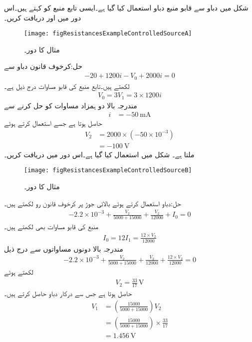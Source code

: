 شکل  میں دباو سے قابو منبع دباو استعمال کیا گیا ہے۔ایسی تابع منبع کو  کہتے ہیں۔اس دور میں   اور  دریافت کریں۔
\begin{figure}
\centering
\texttt{[image: figResistancesExampleControlledSourceA]}
\caption{مثال  کا دور۔}
\label{شکل_مزاحمتی_مثال_تابع_منبع_الف}
\end{figure}

حل:کرخوف قانون دباو سے
\begin{align*}
-20+1200 i-V_0+2000 i=0
\end{align*}
لکھتے ہیں۔تابع منبع کی قابو مساوات درج ذیل ہے۔
\begin{align*}
V_0=3V_1 = 3\times 1200 i
\end{align*}
مندرجہ بالا دو ہمزاد مساوات کو حل کرنے سے
\begin{align*}
i&=\SI{-50}{\milli\ampere}
\end{align*}
حاصل ہوتا ہے جسے استعمال کرتے ہوئے
\begin{align*}
V_2&=2000 \times (-50\times 10^{-3})\\
&=\SI{-100}{\volt}
\end{align*}
ملتا ہے۔
شکل  میں  استعمال کیا گیا ہے۔اس دور میں  دریافت کریں۔
\begin{figure}
\centering
\texttt{[image: figResistancesExampleControlledSourceB]}
\caption{مثال  کا دور۔}
\label{شکل_مزاحمتی_مثال_تابع_منبع_ب}
\end{figure}

حل:دباو  استعمال کرتے ہوئے بالائی جوڑ پر کرخوف قانون رو لکھتے ہیں۔
\begin{align*}
-2.2\times 10^{-3}+\frac{V_2}{5000+15000}+\frac{V_2}{12000}+I_0=0
\end{align*}
منبع کی قابو مساوات بھی لکھتے ہیں۔
\begin{align*}
I_0=12 I_1 = \frac{12 \times V_2}{12000} 
\end{align*}
مندرجہ بالا دونوں مساواتوں سے درج ذیل
\begin{align*}
-2.2\times 10^{-3}+\frac{V_2}{5000+15000}+\frac{V_2}{12000}+ \frac{12 \times V_2}{12000} =0
\end{align*}
لکھتے ہوئے
\begin{align*}
V_2=\frac{33}{17} \, \si{\volt}
\end{align*}
حاصل ہوتا ہے جس سے درکار دباو حاصل کرتے ہیں۔
\begin{align*}
V_1&=\left(\frac{15000}{5000+15000} \right) V_2\\
&=\left(\frac{15000}{5000+15000} \right) \times \frac{33}{17}\\
&=\SI{1.456}{\volt}
\end{align*}
\FloatBarrier

